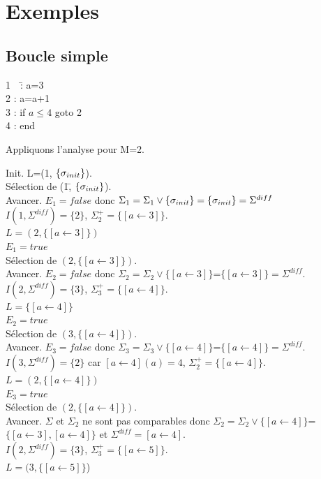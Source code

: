 \section{Exemples}
\subsection{Boucle simple}

\begin{tabbing}
1\ \  \=: a=3\\
2 \>: a=a+1\\
3 \>: if $a\leq 4$ goto 2\\
4 \>: end
\end{tabbing}

Appliquons l'analyse pour M=2.

\begin{tabbing}
Init. L=(1, $\{\sigma_{init}\}$).\\
Sélection de (1,\= $\{\sigma_{init}\}$).\\
Avancer. \> $E_1=false$ donc $\Sigma_1=\Sigma_1\vee\{\sigma_{init}\}=\{\sigma_{init}\}=\Sigma^{diff}$\\
\> $I(1,\Sigma^{diff})=\{2\}$, $\Sigma^+_2=\{[a\leftarrow 3]\}$.\\
\> $L=(2,\{[a\leftarrow 3]\})$\\
\> $E_1=true$\\

Sélection de $(2,\{[a\leftarrow 3]\})$.\\
Avancer. \> $E_2=false$ donc $\Sigma_2=\Sigma_2\vee\{[a\leftarrow 3]\}$=$\{[a\leftarrow 3]\}=\Sigma^{diff}$.\\
\> $I(2,\Sigma^{diff})=\{3\}$, $\Sigma^+_3=\{[a\leftarrow 4]\}$.\\
\> $L=\{[a\leftarrow 4]\}$\\
\> $E_2=true$\\

Sélection de $(3,\{[a\leftarrow 4]\})$.\\
Avancer. \> $E_3=false$ donc $\Sigma_3=\Sigma_3\vee\{[a\leftarrow 4]\}$=$\{[a\leftarrow 4]\}=\Sigma^{diff}$.\\
\> $I(3,\Sigma^{diff})=\{2\}$ car $[a\leftarrow 4](a)=4$, $\Sigma^+_2=\{[a\leftarrow 4]\}$.\\
\> $L=(2,\{[a\leftarrow 4]\})$\\
\> $E_3=true$\\

Sélection de $(2,\{[a\leftarrow 4]\})$.\\
Avancer. \> $\Sigma$ et $\Sigma_2$ ne sont pas comparables donc $\Sigma_2=\Sigma_2\vee\{[a\leftarrow 4]\}$=$\{[a\leftarrow 3],[a\leftarrow 4]\}$ et $\Sigma^{diff}=[a\leftarrow 4].$\\
\> $I(2,\Sigma^{diff})=\{3\}$, $\Sigma^+_3=\{[a\leftarrow 5]\}$.\\
\> $L=(3,\{[a\leftarrow 5]\}$)\\


\end{tabbing}
